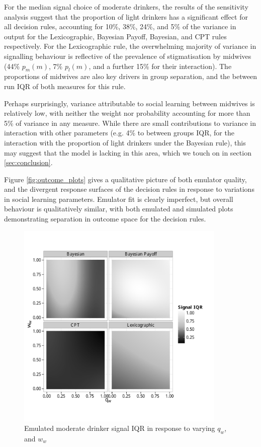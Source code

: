 For the median signal choice of moderate drinkers, the results of the sensitivity analysis suggest that the proportion of light drinkers has a significant effect for all decision rules, accounting for 10\%, 38\%, 24\%, and 5\% of the variance in output for the Lexicographic, Bayesian Payoff, Bayesian, and \ac{CPT} rules respectively. For the Lexicographic rule, the overwhelming majority of variance in signalling behaviour is reflective of the prevalence of stigmatisation by midwives (44\% \(p_{m}(m)\), 7\% \(p_{l}(m)\), and a further 15\% for their interaction).  The proportions of midwives are also key drivers in group separation, and the between run IQR of both measures for this rule. 

Perhaps surprisingly, variance attributable to social learning between midwives is relatively low, with neither the weight nor probability accounting for more than 5\% of variance in any measure. While there are small contributions to variance in interaction with other parameters (e.g. 4\% to between groups IQR, for the interaction with the proportion of light drinkers under the Bayesian rule), this may suggest that the model is lacking in this area, which we touch on in section \ref{sec:conclusion}.

Figure \ref{fig:outcome_plots} gives a qualitative picture of both emulator quality, and the divergent response surfaces of the decision rules in response to variations in social learning parameters. Emulator fit is clearly imperfect, but overall behaviour is qualitatively similar, with both emulated and simulated plots demonstrating separation in outcome space for the decision rules.

\begin{figure}[H]
\includegraphics[width=100mm]{figures/unfixed_emu_sig_iqr}
\caption{Emulated moderate drinker signal IQR in response to varying \(q_{w}\), and \(w_{w}\)}
\label{fig:emulated_sharing_iqr}
\end{figure}

